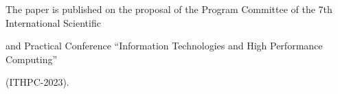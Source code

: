  








\vspace*{-10pt}





\Ack



\vspace*{-3pt}



\noindent

The paper is published on the proposal of the Program Committee of the 7th International Scientific 

and Practical Conference ``Information Technologies and High Performance Computing''  

(ITHPC-2023).






\renewcommand{\bibname}{\protect\rmfamily References}




